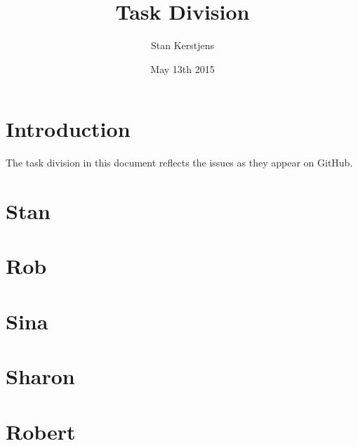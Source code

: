 \documentclass[a4paper]{article}
\title{Task Division}
\author{Stan Kerstjens}
\date{May 13th 2015}
\begin{document}
	\maketitle

	\section{Introduction}
		The task division in this document reflects the issues as they appear on GitHub.
	
	\tableofcontents
	
	\section{Stan}
		
	\section{Rob}
		
	\section{Sina}
		
	\section{Sharon}
		
	\section{Robert}
		
\end{document}
